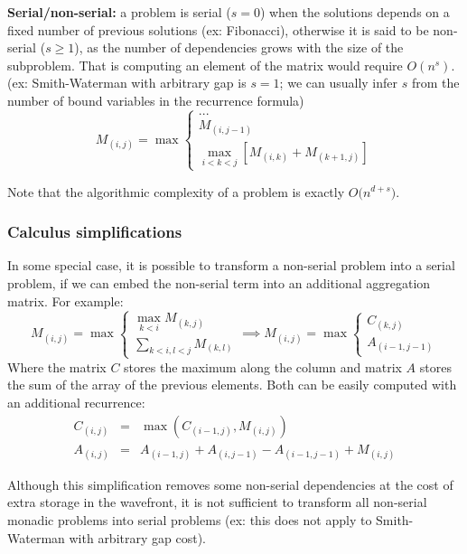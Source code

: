 \item \textbf{Serial/non-serial:} a problem is serial ($s=0$) when the solutions depends on a fixed number of previous solutions (ex: Fibonacci), otherwise it is said to be non-serial ($s\ge 1$), as the number of dependencies grows with the size of the subproblem. That is computing an element of the matrix would require $O(n^s)$.  (ex: Smith-Waterman with arbitrary gap is $s=1$; we can usually infer $s$ from the number of bound variables in the recurrence formula)
	\[M_{(i,j)}=\max\left\{\begin{array}{l} ... \\ M_{(i,j-1)}\\ \max\limits_{i<k<j} [ M_{(i,k)}+M_{(k+1,j)} ] \end{array}\right. \]
\ule

Note that the algorithmic complexity of a problem is exactly $O\big(n^{d+s}\big)$.

\subsubsection{Calculus simplifications} \label{calc_simplifications}
In some special case, it is possible to transform a non-serial problem into a serial problem, if we can embed the non-serial term into an additional aggregation matrix. For example:
	\[M_{(i,j)}=\max\left\{\begin{array}{l} \max\limits_{k<i} M_{(k,j)}
	\\ \sum\limits_{k<i, l<j}M_{(k,l)} \end{array}\right.
	\implies M_{(i,j)}=\max\left\{\begin{array}{l} C_{(k,j)} \\ A_{(i-1,j-1)} \end{array}\right.\]
Where the matrix $C$ stores the maximum along the column and matrix $A$ stores the sum of the array of the previous elements. Both can be easily computed with an additional recurrence:
	\[\begin{array}{rcl} C_{(i,j)}&=&\max(C_{(i-1,j)}, M_{(i,j)}) \\
	A_{(i,j)}&=&A_{(i-1,j)}+A_{(i,j-1)}-A_{(i-1,j-1)}+M_{(i,j)}\end{array}\]

Although this simplification removes some non-serial dependencies at the cost of extra storage in the wavefront, it is not sufficient to transform all non-serial monadic problems into serial problems (ex: this does not apply to Smith-Waterman with arbitrary gap cost).

